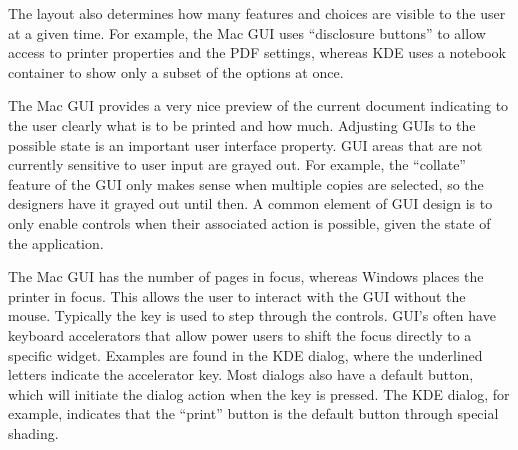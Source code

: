 The layout also determines how many features and choices are visible to the
user at a given time.  For example, the Mac GUI uses ``disclosure
buttons'' to allow access to printer properties and the PDF settings,
whereas KDE uses a notebook container to show only a subset of the
options at once.

The Mac GUI provides a very nice preview of the current document
indicating to the user clearly what is to be printed and how
much. Adjusting GUIs to the possible state is an important user
interface property.  GUI areas that are not currently sensitive to
user input are grayed out. For example, the ``collate'' feature of the
GUI only makes sense when multiple copies are selected, so the
designers have it grayed out until then. A common element of GUI
design is to only enable controls when their associated action is
possible, given the state of the application.

 
The Mac GUI has the number of pages in focus, whereas Windows places
the printer in focus. This allows the user to interact with the GUI
without the mouse. Typically the  key is used to step through
the controls. GUI's often have keyboard accelerators that allow power
users to shift the focus directly to a specific widget. Examples are
found in the KDE dialog, where the underlined letters indicate the
accelerator key. Most dialogs also have a default button, which will
initiate the dialog action when the  key is pressed. The
KDE dialog, for example, indicates that the ``print'' button is the
default button through special shading.




